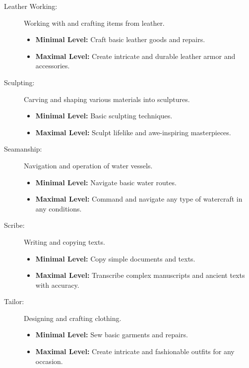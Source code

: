 \documentclass[12pt]{book}
\begin{document}
\begin{description}
    \item[Leather Working:] Working with and crafting items from leather.
        \begin{itemize}
            \item \textbf{Minimal Level:} Craft basic leather goods and repairs.
            \item \textbf{Maximal Level:} Create intricate and durable leather armor and accessories.
        \end{itemize}

    \item[Sculpting:] Carving and shaping various materials into sculptures.
        \begin{itemize}
            \item \textbf{Minimal Level:} Basic sculpting techniques.
            \item \textbf{Maximal Level:} Sculpt lifelike and awe-inspiring masterpieces.
        \end{itemize}

    \item[Seamanship:] Navigation and operation of water vessels.
        \begin{itemize}
            \item \textbf{Minimal Level:} Navigate basic water routes.
            \item \textbf{Maximal Level:} Command and navigate any type of watercraft in any conditions.
        \end{itemize}

    \item[Scribe:] Writing and copying texts.
        \begin{itemize}
            \item \textbf{Minimal Level:} Copy simple documents and texts.
            \item \textbf{Maximal Level:} Transcribe complex manuscripts and ancient texts with accuracy.
        \end{itemize}

    \item[Tailor:] Designing and crafting clothing.
        \begin{itemize}
            \item \textbf{Minimal Level:} Sew basic garments and repairs.
            \item \textbf{Maximal Level:} Create intricate and fashionable outfits for any occasion.
        \end{itemize}


\end{description}
\end{document}

